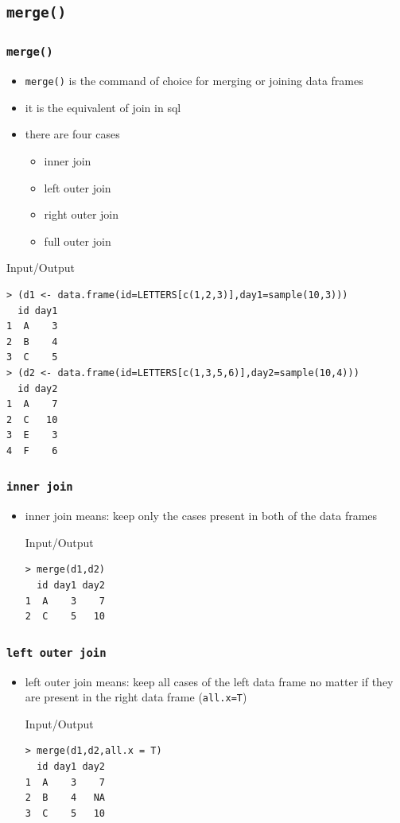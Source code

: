 \documentclass[xcolor={table},c]{beamer}
\begin{document}
\subsection{\texttt{merge()}}
\begin{frame}\frametitle{\texttt{merge()}}
\begin{itemize}
\item \texttt{merge()} is the command of choice for merging or joining data frames
\item it is the equivalent of join in sql
\item there are four cases
  \begin{itemize}
  \item inner join
  \item left outer join
  \item right outer join
  \item full outer join
  \end{itemize}
\end{itemize}
  \begin{exampleblock}{Input/Output}\small
\begin{verbatim}
> (d1 <- data.frame(id=LETTERS[c(1,2,3)],day1=sample(10,3)))
  id day1
1  A    3
2  B    4
3  C    5
> (d2 <- data.frame(id=LETTERS[c(1,3,5,6)],day2=sample(10,4)))
  id day2
1  A    7
2  C   10
3  E    3
4  F    6
\end{verbatim}
  \end{exampleblock}
\end{frame}


\begin{frame}[fragile]\frametitle{\texttt{inner join}}
\begin{itemize}
\item inner join means: keep only the cases present in both of the data frames
  \begin{exampleblock}{Input/Output}\small
\begin{verbatim}
> merge(d1,d2)
  id day1 day2
1  A    3    7
2  C    5   10
\end{verbatim}
  \end{exampleblock}
\end{itemize}
\end{frame}

\begin{frame}[fragile]\frametitle{\texttt{left outer join}}
\begin{itemize}
\item left outer join means: keep all cases of the left data frame no matter if they are present in the right data frame (\texttt{all.x=T})
  \begin{exampleblock}{Input/Output}\small
\begin{verbatim}
> merge(d1,d2,all.x = T)
  id day1 day2
1  A    3    7
2  B    4   NA
3  C    5   10
\end{verbatim}
  \end{exampleblock}
\end{itemize}
\end{frame}
\end{document}
